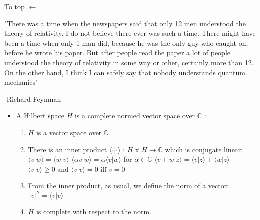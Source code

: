 \documentclass{article}
\def\pagedone{\newpage}
\def\tthdump#1{#1}
\def\braket#1#2{\langle{#1}|{#2}\rangle}
\def\hilbert{\mathit{H}}
\def\complex{\mathbb{C}}
\begin{document}
\tthdump{\hyperlink{Our general topics:}{\hfil To top $\leftarrow$}}

\pagedone



"There was a time when the newspapers said that only 12 men understood the
theory of relativity. I do not believe there ever was such a time. There
might have been a time when only 1 man did, because he was the only guy who
caught on, before he wrote his paper. But after people read the paper a lot
of people understood the theory of relativity in some way or other,
certainly more than 12. On the other hand, I think I can safely say that
nobody understands quantum mechanics"

-Richard Feynman

\pagedone


\begin{itemize}
	\item A Hilbert space $\hilbert$ is a complete normed vector space over $\complex$ :
	\begin{enumerate}
		\item $\hilbert$ is a vector space over $\complex$
		\item There is an inner product \newline
			$\braket \cdot \cdot$ : $\hilbert$ x $\hilbert \rightarrow \complex$
			\newline
			which is conjugate linear: \newline
			$\braket v w = \overline{\braket w v} $  \newline
			$\braket {\alpha v} {w} = \alpha \braket v w $
				for $\alpha \in \complex$ \newline
			$\braket {v+w} z = \braket v z + \braket w z $ \newline
			$\braket vv \ge 0$ and $\braket vv = 0$ iff $v = 0$
		\item From the inner product, as usual, we define the norm of a vector: \newline
			$ \Vert v \Vert ^ 2 = \braket v v $
		\item $\hilbert$ is complete with respect to the norm.
	\end{enumerate}
	
\end{itemize}
\end{document}
